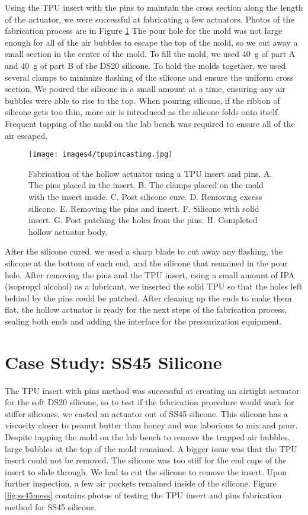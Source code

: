 Using the TPU insert with the pins to maintain the cross section along the length of the actuator, we were successful at fabricating a few actuators. Photos of the fabrication process are in Figure \ref{fig:tpupinfab} The pour hole for the mold was not large enough for all of the air bubbles to escape the top of the mold, so we cut away a small section in the center of the mold. To fill the mold, we used 40~g of part A and 40~g of part B of the DS20 silicone. To hold the molds together, we used several clamps to minimize flashing of the silicone and ensure the uniform cross section. We poured the silicone in a small amount at a time, ensuring any air bubbles were able to rise to the top. When pouring silicone, if the ribbon of silicone gets too thin, more air is introduced as the silicone folds onto itself. Frequent tapping of the mold on the lab bench was required to ensure all of the air escaped. 

\begin{figure}[h]
    \centering
    \texttt{[image: images4/tpupincasting.jpg]}
    \caption{Fabrication of the hollow actuator using a TPU insert and pins. A. The pins placed in the insert. B. The clamps placed on the mold with the insert inside. C. Post silicone cure. D. Removing excess silicone. E. Removing the pins and insert. F. Silicone with solid insert. G. Post patching the holes from the pins. H. Completed hollow actuator body.}
    \label{fig:tpupinfab}
\end{figure}

After the silicone cured, we used a sharp blade to cut away any flashing, the silicone at the bottom of each end, and the silicone that remained in the pour hole. After removing the pins and the TPU insert, using a small amount of IPA (isopropyl alcohol) as a lubricant, we inserted the solid TPU so that the holes left behind by the pins could be patched. After cleaning up the ends to make them flat, the hollow actuator is ready for the next steps of the fabrication process, sealing both ends and adding the interface for the pressurization equipment. 

\section{Case Study: SS45 Silicone}

The TPU insert with pins method was successful at creating an airtight actuator for the soft DS20 silicone, so to test if the fabrication procedure would work for stiffer silicones, we casted an actuator out of SS45 silicone. This silicone has a viscosity closer to peanut butter than honey and was laborious to mix and pour. Despite tapping the mold on the lab bench to remove the trapped air bubbles, large bubbles at the top of the mold remained. A bigger issue was that the TPU insert could not be removed. The silicone was too stiff for the end caps of the insert to slide through. We had to cut the silicone to remove the insert. Upon further inspection, a few air pockets remained inside of the silicone. Figure \ref{fig:ss45mess} contains photos of testing the TPU insert and pins fabrication method for SS45 silicone. 

